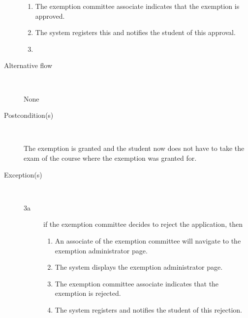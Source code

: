 \begin{description}
\begin{enumerate}
	  	\item The exemption committee associate indicates that the exemption is
	  	approved.
	  	\item The system registers this and notifies the student of this approval.
	  	\item
	\end{enumerate}
	\item[Alternative flow] \
		\par None
	\item[Postcondition(s)] \ 
		\par The exemption is granted and the student now does not have to take the
		exam of the course where the exemption was granted for. 
	\item[Exception(s)] \ 
	\begin{description}
		\item[3a] if the exemption committee decides to reject the application, then
		\begin{enumerate}
		  \item An associate of the exemption committee will navigate to the exemption administrator page.
		  \item The system displays the exemption administrator page.
		  \item The exemption committee associate indicates that the exemption is
		  rejected.
		  \item The system registers and notifies the student of this rejection.
		\end{enumerate}
	\end{description}
\end{description}